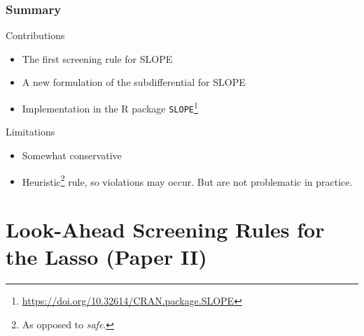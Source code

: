 \documentclass[10pt]{beamer}
\begin{document}
%
%
%
%

\begin{frame}[c]
  \frametitle{Summary}

  \begin{exampleblock}{Contributions}
    \begin{itemize}
      \item The first screening rule for SLOPE
      \item A new formulation of the subdifferential for SLOPE
      \item Implementation in the R package
            \texttt{SLOPE}\footnote{\url{https://doi.org/10.32614/CRAN.package.SLOPE}}
    \end{itemize}
  \end{exampleblock}

  \pause

  \begin{alertblock}{Limitations}
    \begin{itemize}
      \item Somewhat conservative
      \item Heuristic\footnote[frame]{As opposed to \emph{safe}.} rule, so violations may occur. But
            are not problematic in practice.
    \end{itemize}
  \end{alertblock}
\end{frame}

\section{Look-Ahead Screening Rules for the Lasso (Paper II)}
\end{document}
